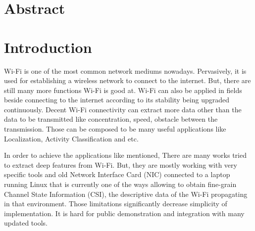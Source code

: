 \documentclass[10pt,letterpaper]{article}
\begin{document}
	\section*{Abstract}
	

	
	\linenumbers
	
	\section*{Introduction}
	Wi-Fi is one of the most common network mediums nowadays. Pervasively, it is used for establishing a wireless network to connect to the internet. But, there are still many more functions Wi-Fi is good at. Wi-Fi can also be applied in fields beside connecting to the internet according to its stability being upgraded continuously. Decent Wi-Fi connectivity can extract more data other than the data to be transmitted like concentration, speed, obstacle between the transmission. Those can be composed to be many useful applications like Localization, Activity Classification and etc.
	
	In order to achieve the applications like mentioned, There are many works tried to extract deep features from Wi-Fi. But, they are mostly working with very specific tools and old Network Interface Card (NIC) connected to a laptop running Linux that is currently one of the ways allowing to obtain fine-grain Channel State Information (CSI), the descriptive data of the  Wi-Fi propagating in that environment. Those limitations significantly decrease simplicity of implementation. It is hard for public demonstration and integration with many updated tools.
	
\end{document}
